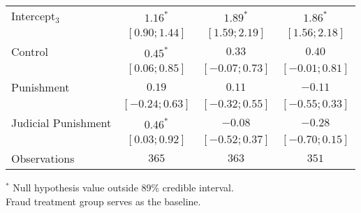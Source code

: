 \begin{table}[h]
\begin{center}
\begin{threeparttable}
\begin{tabular}{l c c c}
Intercept$_3$       & $1.16^{*}$        & $1.89^{*}$        & $1.86^{*}$        \\
                    & $ [ 0.90;  1.44]$ & $ [ 1.59;  2.19]$ & $ [ 1.56;  2.18]$ \\
Control             & $0.45^{*}$        & $0.33$            & $0.40$            \\
                    & $ [ 0.06;  0.85]$ & $ [-0.07;  0.73]$ & $ [-0.01;  0.81]$ \\
Punishment          & $0.19$            & $0.11$            & $-0.11$           \\
                    & $ [-0.24;  0.63]$ & $ [-0.32;  0.55]$ & $ [-0.55;  0.33]$ \\
Judicial Punishment & $0.46^{*}$        & $-0.08$           & $-0.28$           \\
                    & $ [ 0.03;  0.92]$ & $ [-0.52;  0.37]$ & $ [-0.70;  0.15]$ \\
\hline
Observations        & $365$             & $363$             & $351$             \\
\hline
\end{tabular}
\begin{tablenotes}[flushleft]
\scriptsize{$^*$ Null hypothesis value outside 89\% credible interval.  \\
Fraud treatment group serves as the baseline.}
\end{tablenotes}
\end{threeparttable}
\label{table:ol_main_la_npol_376}
\end{center}
\end{table}
